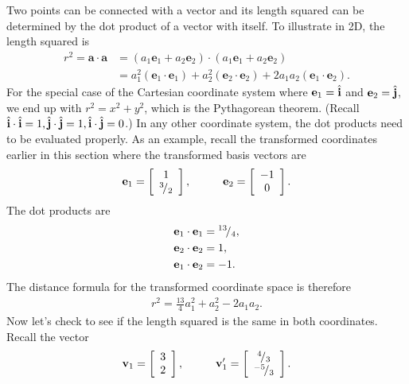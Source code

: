 Two points can be connected with a vector and its length squared can be determined by the dot product of a vector with itself. To illustrate in 2D, the length squared is
\begin{align} \label{Eqn:linearAlgebra_LengthSquared2D}
  r^2 = \mathbf{a} \cdot \mathbf{a} &= ( a_1 \mathbf{e}_1 + a_2 \mathbf{e}_2 ) \cdot ( a_1 \mathbf{e}_1 + a_2 \mathbf{e}_2 ) \nonumber \\
  &= a_1^2 ( \mathbf{e}_1 \cdot \mathbf{e}_1 ) + a_2^2 ( \mathbf{e}_2 \cdot \mathbf{e}_2 ) + 2 a_1 a_2 ( \mathbf{e}_1 \cdot \mathbf{e}_2 ).
\end{align}
For the special case of the Cartesian coordinate system where $\mathbf{e}_1 = \hat{\mathbf{i}}$ and $\mathbf{e}_2 = \hat{\mathbf{j}}$,  we end up with $r^2 = x^2 + y^2$, which is the Pythagorean theorem. (Recall $\hat{\mathbf{i}} \cdot \hat{\mathbf{i}} = 1, \hat{\mathbf{j}} \cdot \hat{\mathbf{j}} = 1, \hat{\mathbf{i}} \cdot \hat{\mathbf{j}} = 0$.) In any other coordinate system, the dot products need to be evaluated properly. As an example, recall the transformed coordinates earlier in this section where the transformed basis vectors are
\begin{align}
  \mathbf{e}_1 = \left[ \begin{array}{c}  1 \\ {}^{3}\!/_{2} \end{array} \right] , \hspace{1cm}
  \mathbf{e}_2 = \left[ \begin{array}{c} -1 \\ 0 \end{array} \right] . \nonumber
\end{align}
The dot products are
\begin{align}
  \mathbf{e}_1 \cdot \mathbf{e}_1 &= {}^{13}\!/_{4}, \nonumber \\
  \mathbf{e}_2 \cdot \mathbf{e}_2 &= 1, \nonumber \\
  \mathbf{e}_1 \cdot \mathbf{e}_2 &= -1. \nonumber
\end{align}
The distance formula for the transformed coordinate space is therefore
\begin{align}
  r^2 = \frac{13}{4} a_1^2  + a_2^2 - 2 a_1 a_2 . \nonumber
\end{align}
Now let's check to see if the length squared is the same in both coordinates. Recall the vector
\begin{align}
  \mathbf{v}_1  = \left[ \begin{array}{c} 3 \\ 2 \\ \end{array} \right] , \hspace{1cm} 
  \mathbf{v}_1' = \left[ \begin{array}{c} {}^{4}\!/_{3} \\ {}^{-5}\!/_{3} \\ \end{array} \right]. \nonumber
\end{align}

